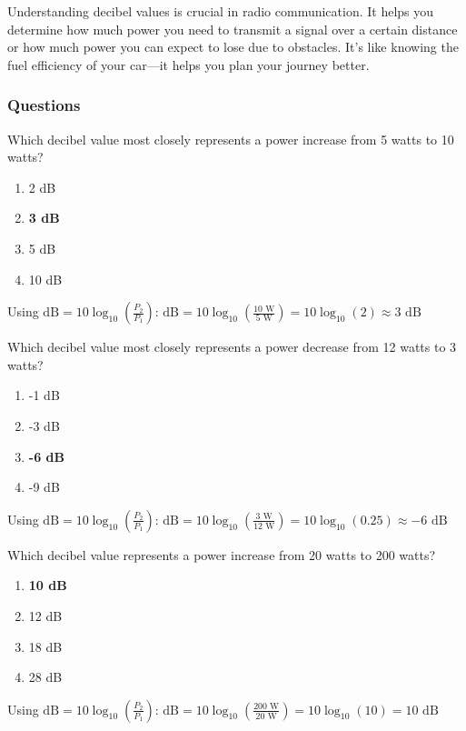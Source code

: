 Understanding decibel values is crucial in radio communication. It helps you determine how much power you need to transmit a signal over a certain distance or how much power you can expect to lose due to obstacles. It's like knowing the fuel efficiency of your car—it helps you plan your journey better.


\subsubsection*{Questions}

\begin{tcolorbox}[colback=gray!10!white,colframe=black!75!black,title={T5B09}]
Which decibel value most closely represents a power increase from 5 watts to 10 watts?
\begin{enumerate}[label=\Alph*),noitemsep]
    \item 2 dB
    \item \textbf{3 dB}
    \item 5 dB
    \item 10 dB
\end{enumerate}
\end{tcolorbox}

Using $\text{dB} = 10 \log_{10}(\frac{P_2}{P_1})$:
$\text{dB} = 10 \log_{10}(\frac{10\text{ W}}{5\text{ W}}) = 10 \log_{10}(2) \approx 3\text{ dB}$

\begin{tcolorbox}[colback=gray!10!white,colframe=black!75!black,title={T5B10}]
Which decibel value most closely represents a power decrease from 12 watts to 3 watts?
\begin{enumerate}[label=\Alph*),noitemsep]
    \item -1 dB
    \item -3 dB
    \item \textbf{-6 dB}
    \item -9 dB
\end{enumerate}
\end{tcolorbox}

Using $\text{dB} = 10 \log_{10}(\frac{P_2}{P_1})$:
$\text{dB} = 10 \log_{10}(\frac{3\text{ W}}{12\text{ W}}) = 10 \log_{10}(0.25) \approx -6\text{ dB}$

\begin{tcolorbox}[colback=gray!10!white,colframe=black!75!black,title={T5B11}]
Which decibel value represents a power increase from 20 watts to 200 watts?
\begin{enumerate}[label=\Alph*),noitemsep]
    \item \textbf{10 dB}
    \item 12 dB
    \item 18 dB
    \item 28 dB
\end{enumerate}
\end{tcolorbox}

Using $\text{dB} = 10 \log_{10}(\frac{P_2}{P_1})$:
$\text{dB} = 10 \log_{10}(\frac{200\text{ W}}{20\text{ W}}) = 10 \log_{10}(10) = 10\text{ dB}$
